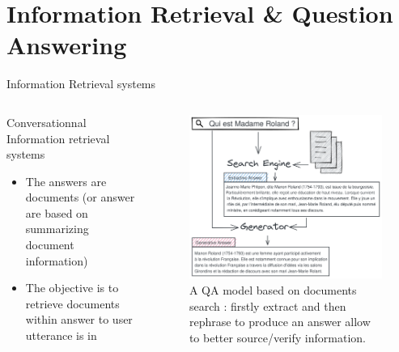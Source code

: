 \documentclass[10pt,aspectratio=169]{beamer}
\begin{document}
\section{Information Retrieval \& Question Answering}
\begin{frame}{Information Retrieval systems}
    \begin{columns}
        \begin{column}{0.5\textwidth}
             \begin{block}{Conversationnal Information retrieval systems}
                \begin{itemize}
                    \item The answers are documents (or answer are based on summarizing document information)
                    \item The objective is to retrieve documents within answer to user utterance is in
                \end{itemize}
            \end{block}       
        \end{column}
        \begin{column}{0.5\textwidth}
            \begin{figure}
                \centering
                \includegraphics[width=.9\textwidth]{media/who-is-rolland.png}
                \caption{\scriptsize A QA model based on documents search : firstly extract and then rephrase to produce an answer allow to better source/verify information.}
                \label{fig:my_label}
            \end{figure}
        \end{column}
    \end{columns}
\end{frame}
\end{document}
